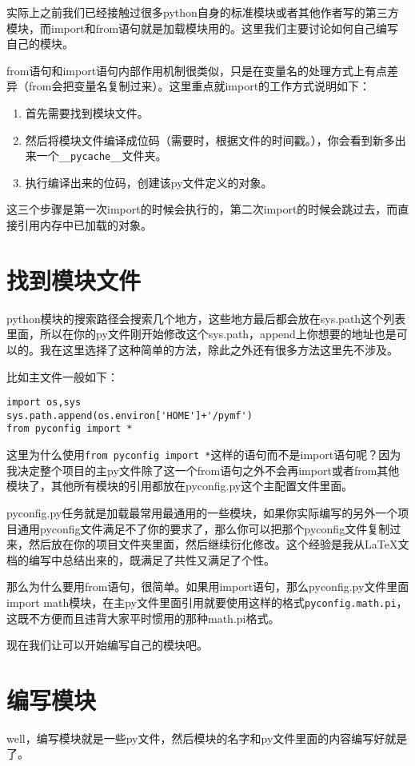 \documentclass[12pt,oneside]{book}
\begin{document}
\begin{common-format}
实际上之前我们已经接触过很多python自身的标准模块或者其他作者写的第三方模块，而import和from语句就是加载模块用的。这里我们主要讨论如何自己编写自己的模块。

from语句和import语句内部作用机制很类似，只是在变量名的处理方式上有点差异（from会把变量名复制过来）。这里重点就import的工作方式说明如下：
\begin{enumerate}
\item 首先需要找到模块文件。
\item 然后将模块文件编译成位码（需要时，根据文件的时间戳。），你会看到新多出来一个\verb+__pycache__+文件夹。
\item 执行编译出来的位码，创建该py文件定义的对象。
\end{enumerate}
这三个步骤是第一次import的时候会执行的，第二次import的时候会跳过去，而直接引用内存中已加载的对象。



\section{找到模块文件}
python模块的搜索路径会搜索几个地方，这些地方最后都会放在sys.path这个列表里面，所以在你的py文件刚开始修改这个sys.path，append上你想要的地址也是可以的。我在这里选择了这种简单的方法，除此之外还有很多方法这里先不涉及。

比如主文件一般如下：
\begin{Verbatim}
import os,sys
sys.path.append(os.environ['HOME']+'/pymf')
from pyconfig import *
\end{Verbatim}
这里为什么使用\verb+from pyconfig import *+这样的语句而不是import语句呢？因为我决定整个项目的主py文件除了这一个from语句之外不会再import或者from其他模块了，其他所有模块的引用都放在pyconfig.py这个主配置文件里面。

pyconfig.py任务就是加载最常用最通用的一些模块，如果你实际编写的另外一个项目通用pyconfig文件满足不了你的要求了，那么你可以把那个pyconfig文件复制过来，然后放在你的项目文件夹里面，然后继续衍化修改。这个经验是我从\LaTeX 文档的编写中总结出来的，既满足了共性又满足了个性。

那么为什么要用from语句，很简单。如果用import语句，那么pyconfig.py文件里面import math模块，在主py文件里面引用就要使用这样的格式\verb+pyconfig.math.pi+，这既不方便而且违背大家平时惯用的那种math.pi格式。


现在我们让可以开始编写自己的模块吧。

\section{编写模块}
well，编写模块就是一些py文件，然后模块的名字和py文件里面的内容编写好就是了。


\end{common-format}
\end{document}
